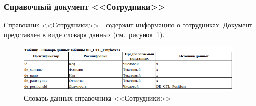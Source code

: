 

\subsubsection{Справочный документ <<Сотрудники>>}

Справочник <<Сотрудники>> - содержит информацию о сотрудниках.
Документ представлен в виде словаря данных (см.~рисунок~\ref{fig:InformationalModel_DE_CTL_Employees}).

\begin{figure}[!h]
    \centering
    \includegraphics[width=16cm]
    {assets/InformationalModel/DE_CTL_Employees.png}
    \caption{Словарь данных справочника <<Сотрудники>>}
    \label{fig:InformationalModel_DE_CTL_Employees}
\end{figure}






